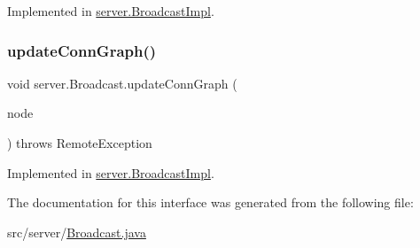 Implemented in \hyperlink{classserver_1_1_broadcast_impl_a1ddfea5e6826ec8ff3e6aa3a3a525ccb}{server.\+Broadcast\+Impl}.

\mbox{\label{interfaceserver_1_1_broadcast_a9efddebebb91a7da6bc0ecddcc7a32e6}} 
\subsubsection{\texorpdfstring{update\+Conn\+Graph()}{updateConnGraph()}}
{\footnotesize\ttfamily void server.\+Broadcast.\+update\+Conn\+Graph (\begin{DoxyParamCaption}\item[{\hyperlink{classstructure_1_1_group_node}{Group\+Node}}]{node }\end{DoxyParamCaption}) throws Remote\+Exception}



Implemented in \hyperlink{classserver_1_1_broadcast_impl_abf98d794cdcf469b48cae2fbb23f1479}{server.\+Broadcast\+Impl}.



The documentation for this interface was generated from the following file\+:\begin{DoxyCompactItemize}
\item 
src/server/\hyperlink{_broadcast_8java}{Broadcast.\+java}\end{DoxyCompactItemize}

